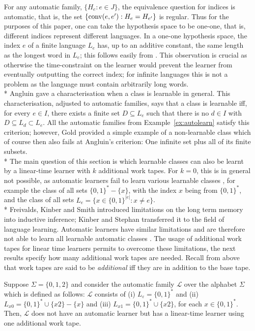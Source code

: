 \documentclass{LMCS}
\newcommand{\CalL}{{\mathcal L}}
\theoremstyle{plain}\newtheorem{athm}[thm]{Theorem}
\theoremstyle{plain}\newtheorem{aprop}[thm]{Proposition}
\theoremstyle{plain}\newtheorem{aprob}[thm]{Open Problem}
\theoremstyle{plain}\newtheorem{acor}[thm]{Corollary}
\theoremstyle{plain}\newtheorem{alem}[thm]{Lemma}
\theoremstyle{definition}\newtheorem{adefn}[thm]{Definition}
\theoremstyle{definition}\newtheorem{arem}[thm]{Remark}
\theoremstyle{plain}\newtheorem{aexmp}[thm]{Example}
\theoremstyle{plain}\newtheorem{aclm}[thm]{Claim}
\def\conv{{\rm{conv}}}
\def\sp{\\*\indent}
\begin{document}
\noindent
For any automatic family, $\{H_e: e \in J\}$, 
the equivalence question for indices is automatic, that is,
the set $\{\conv(e,e'): H_e=H_{e'}\}$ is regular.
Thus for the purposes of this paper, 
one can take the hypothesis space to be one-one, 
that is, different indices represent different languages.
In a one-one hypothesis space, the index $e$ of a finite language $L_e$
has, up to an additive constant, the same length as the longest word in $L_e$;
this follows easily from \cite[Theorem 3.5]{JOPS10}.
This observation is crucial as otherwise the time-constraint on the learner
would prevent the learner from eventually outputting the correct index;
for infinite languages this is not a problem as the language must contain
arbitrarily long words.
\sp
Angluin \cite{An80} gave a characterisation when a class is learnable in 
general. This characterisation, 
adjusted to automatic families, says that a class is learnable
iff, for every $e \in I$, there exists a finite set $D \subseteq L_e$
such that there is no $d \in I$ with $D \subseteq L_d \subset L_e$. All
the automatic families from Example~\ref{ex:autolearn} satisfy this criterion;
however, Gold \cite{Go67} provided a simple example of a non-learnable
class which of course then also fails at Angluin's criterion: One infinite
set plus all of its finite subsets.
\sp
The main question of this
section is which learnable classes can also be learnt by a linear-time learner
with $k$ additional work tapes. For $k=0$,
this is in general not possible, as 
automatic learners fail to learn various learnable classes \cite{JLS09},
for example the class of all sets $\{0,1\}^*-\{x\}$, with the index
$x$ being from $\{0,1\}^*$, and the class of all
sets $L_e = \{x \in \{0,1\}^{|e|}: x \neq e\}$.
\sp
Freivalds, Kinber and Smith \cite{FKS95} introduced limitations on the
long term memory into inductive inference; Kinber and Stephan \cite{KS95}
transferred it to the field of language learning. Automatic learners have
similar limitations and are therefore not able to learn all learnable
automatic classes \cite{CJLOSS11,JLS09}.
The usage of additional work tapes for linear time learners permits to
overcome these limitations, the next results specify how many additional
work tapes are needed. 
Recall from above that work tapes are said to be {\em additional\/}
iff they are in addition to
the base tape.

\begin{thm} \label{th:onetape}
Suppose $\Sigma=\{0,1,2\}$ and consider the automatic family
$\CalL$ over the alphabet $\Sigma$ which is defined as follows:
$\CalL$ consists of
(i) $L_{\varepsilon} = \{0,1\}^*$ and
(ii) $L_{x0} = \{0,1\}^*\cup \{x2\}-\{x\}$ and 
(iii) $L_{x1}=\{0,1\}^*\cup\{x2\}$,
for each $x \in \{0,1\}^*$.
Then, $\CalL$
does not have an automatic learner but has a linear-time learner using one
additional work tape.
\end{thm}
\end{document}
